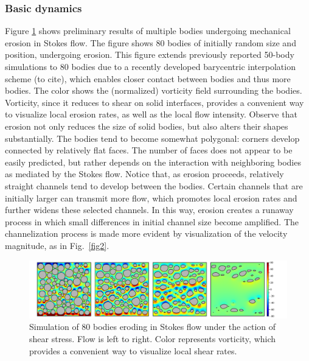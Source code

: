 \documentclass[12pt]{article}
\newcommand{\tocite}{{\color{blue}(to cite)}}
\begin{document}
\subsubsection{Basic dynamics}

 Figure \ref{fig1} shows preliminary results of multiple bodies undergoing mechanical erosion in Stokes flow. The figure shows 80 bodies of initially random size and position, undergoing erosion. This figure extends previously reported 50-body simulations to 80 bodies \cite{Quaife2018} due to a recently developed barycentric interpolation scheme \tocite, which enables closer contact between bodies and thus more bodies.
The color shows the (normalized) vorticity field surrounding the bodies. Vorticity, since it reduces to shear on solid interfaces, provides a convenient way to visualize local erosion rates, as well as the local flow intensity. Observe that erosion not only reduces the size of solid bodies, but also alters their shapes substantially. The bodies tend to become somewhat polygonal: corners develop connected by relatively flat faces. The number of faces does not appear to be easily predicted, but rather depends on the interaction with neighboring bodies as mediated by the Stokes flow. Notice that, as erosion proceeds, relatively straight channels tend to develop between the bodies. Certain channels that are initially larger can transmit more flow, which promotes local erosion rates and further widens these selected channels. In this way, erosion creates a runaway process in which small differences in initial channel size become amplified. The channelization process is made more evident by visualization of the velocity magnitude, as in Fig.~\ref{fig2}.

\begin{figure}%
\begin{center}
\includegraphics[width = 0.99 \textwidth]{./figs/80circ8vort.pdf}
\caption{\label{fig1} Simulation of 80 bodies eroding in Stokes flow under the action of shear stress. Flow is left to right. Color represents vorticity, which provides a convenient way to visualize local shear rates. 
}
\end{center}
\end{figure}
 
\end{document}
